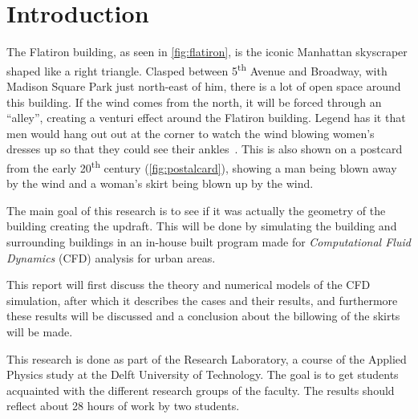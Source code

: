 \section{Introduction}
\label{intro}
The Flatiron building, as seen in \autoref{fig:flatiron}, is the iconic Manhattan skyscraper shaped like a right triangle. Clasped between 5\textsuperscript{th} Avenue and Broadway, with Madison Square Park just north-east of him, there is a lot of open space around this building. If the wind comes from the north, it will be forced through an ``alley'', creating a venturi effect around the Flatiron building. Legend has it that men would hang out out at the corner to watch the wind blowing women's dresses up so that they could see their ankles~\cite{dresses}. This is also shown on a postcard from the early 20\textsuperscript{th} century (\autoref{fig:postalcard}), showing a man being blown away by the wind and a woman's skirt being blown up by the wind.  

The main goal of this research is to see if it was actually the geometry of the building creating the updraft. This will be done by simulating the building and surrounding buildings in an in-house built program made for \emph{Computational Fluid Dynamics} (CFD) analysis for urban areas.

This report will first discuss the theory and numerical models of the CFD simulation, after which it describes the cases and their results, and furthermore these results will be discussed and a conclusion about the billowing of the skirts will be made.

This research is done as part of the Research Laboratory, a course of the Applied Physics study at the Delft University of Technology. The goal is to get students acquainted with the different research groups of the faculty. The results should reflect about 28 hours of work by two students. 

